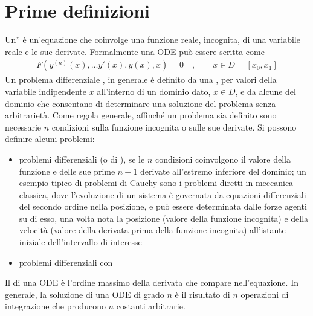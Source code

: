 \documentclass[letterpaper,10pt,italian]{jupyterBook}
\begin{document}
\section{Prime definizioni}
\label{\detokenize{ch/ode:prime-definizioni}}\label{\detokenize{ch/ode:ode-hs-def}}
\sphinxAtStartPar
Un” è un’equazione che coinvolge una funzione reale, incognita, di una variabile reale e le sue derivate. Formalmente una ODE può essere scritta come
\begin{equation*}
\begin{split}F\left(y^{(n)}(x), \dots y'(x), y(x), x \right) = 0 \quad , \qquad x \in D = [x_0, x_1]\end{split}
\end{equation*}
\sphinxAtStartPar
Un problema differenziale , in generale è definito da una , per valori della variabile indipendente \(x\) all’interno di un dominio dato, \(x \in D\), e da alcune  del dominio che consentano di determinare una soluzione del problema senza arbitrarietà. Come regola generale, affinché un problema sia definito sono necessarie \(n\) condizioni sulla funzione incognita o sulle sue derivate. Si possono definire alcuni problemi:
\begin{itemize}
\item {} 
\sphinxAtStartPar
problemi differenziali  (o di ), se le \(n\) condizioni coinvolgono il valore della funzione e delle sue prime \(n-1\) derivate all’estremo inferiore del dominio; un esempio tipico di problemi di Cauchy sono i problemi diretti in meccanica classica, dove l’evoluzione di un sistema è governata da equazioni differenziali del secondo ordine nella posizione, e può essere determinata dalle forze agenti su di esso, una volta nota la posizione (valore della funzione incognita) e della velocità (valore della derivata prima della funzione incognita) all’istante iniziale dell’intervallo di interesse

\item {} 
\sphinxAtStartPar
problemi differenziali con 

\end{itemize}

\sphinxAtStartPar
Il  di una ODE è l’ordine massimo della derivata che compare nell’equazione. In generale, la soluzione di una ODE di grado \(n\) è il risultato di \(n\) operazioni di integrazione che producono \(n\) costanti arbitrarie.
\end{document}
